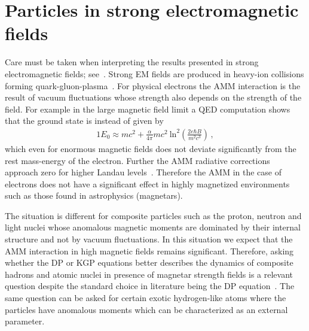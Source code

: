 \section{Particles in strong electromagnetic fields}
\label{sec:sb}
Care must be taken when interpreting the results presented in strong electromagnetic fields; see~\cite{Gonoskov:2021hwf,Fedotov:2022ely,Sainte-Marie:2023aqn}. Strong EM fields are produced in heavy-ion collisions forming quark-gluon-plasma~\citep{Grayson:2022asf}. For physical electrons the AMM interaction is the result of vacuum fluctuations whose strength also depends on the strength of the field. For example in the large magnetic field limit a QED computation shows that the ground state is instead of  given by~\cite{Jancovici:1969exc}
\begin{alignat}{1} \label{vacfl01}
E_{0}\approx mc^{2}+\frac{\alpha}{4\pi}mc^{2}\ \mathrm{ln}^{2}\left(\frac{2e\hbar B}{m^{2}c^{3}}\right)\,,
\end{alignat}
which even for enormous magnetic fields does not deviate significantly from the rest mass-energy of the electron. Further the AMM radiative corrections approach zero for higher Landau levels~\citep{Ferrer:2015wca,Hackebill:2022uxv}. Therefore the AMM in the case of electrons does not have a significant effect in highly magnetized environments such as those found in astrophysics (magnetars).

The situation is different for composite particles such as the proton, neutron and light nuclei whose anomalous magnetic moments are dominated by their internal structure and not by vacuum fluctuations. In this situation we expect that the AMM interaction in high magnetic fields remains significant. Therefore, asking whether the DP or KGP equations better describes the dynamics of composite hadrons and atomic nuclei in presence of magnetar strength fields is a relevant question despite the standard choice in literature being the DP equation~\citep{Broderick:2000pe}. The same question can be asked for certain exotic hydrogen-like atoms where the particles have anomalous moments which can be characterized as an external parameter. 


